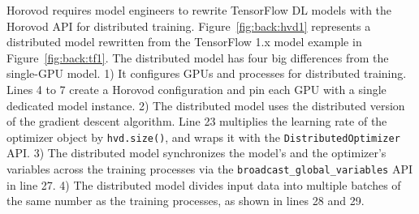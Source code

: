 Horovod requires model engineers to rewrite TensorFlow DL models with the
Horovod API for distributed training.
Figure~\ref{fig:back:hvd1} represents a distributed model rewritten from the
TensorFlow 1.x model example in Figure~\ref{fig:back:tf1}.
The distributed model has four big differences from the single-GPU model.
1) It configures GPUs and processes for distributed training.
Lines 4 to 7 create a Horovod configuration and pin each GPU with
a single dedicated model instance.
2) The distributed model uses the distributed version of the gradient
descent algorithm.
Line 23 multiplies the learning rate of the optimizer object by {\tt hvd.size()},
and wraps it with the {\tt DistributedOptimizer} API.
3) The distributed model synchronizes the model's and the optimizer's variables
across the training processes via the {\tt broadcast\_global\_variables} API 
in line 27.
4) The distributed model divides input data into multiple batches of the same
number as the training processes, as shown in lines 28 and 29.



